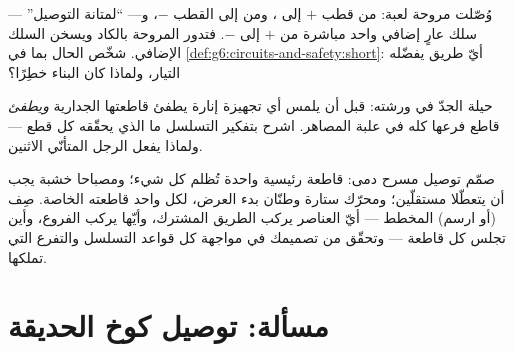 \begin{exercise}[$\star\star$]\label{exo:g6:circuits-and-safety:10}
وُصّلت مروحة لعبة: من قطب  $+$ إلى ، ومن 
إلى القطب $-$، و--- ``لمتانة التوصيل'' --- سلك عارٍ إضافي واحد
مباشرة من $+$ إلى $-$. فتدور المروحة بالكاد ويسخن السلك
الإضافي. شخّص الحال بما في \cref{def:g6:circuits-and-safety:short}:
أيّ طريق يفضّله التيار، ولماذا كان البناء خطِرًا؟
\end{exercise}

\begin{exercise}[$\star\star$]\label{exo:g6:circuits-and-safety:11}
حيلة الجدّ في ورشته: قبل أن يلمس أي تجهيزة إنارة يطفئ قاطعتها
الجدارية \emph{ويطفئ} قاطع فرعها كله في علبة المصاهر. اشرح
بتفكير التسلسل ما الذي يحقّقه كل قطع --- ولماذا يفعل الرجل
المتأنّي الاثنين.
\end{exercise}

\begin{exercise}[$\star\star\star$]\label{exo:g6:circuits-and-safety:12}
صمّم توصيل مسرح دمى: قاطعة رئيسية واحدة تُظلم كل شيء؛ ومصباحا
خشبة يجب أن يتعطّلا مستقلّين؛ ومحرّك ستارة وطنّان بدء العرض،
لكل واحد قاطعته الخاصة. صِف (أو ارسم) المخطط --- أيّ العناصر
يركب الطريق المشترك، وأيّها يركب الفروع، وأين تجلس كل قاطعة ---
وتحقّق من تصميمك في مواجهة كل قواعد التسلسل والتفرع التي
تملكها.
\end{exercise}

\section{مسألة: توصيل كوخ الحديقة}

